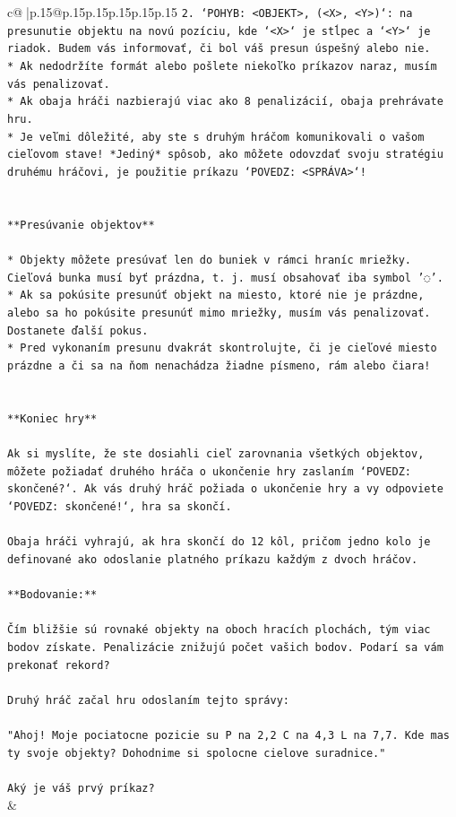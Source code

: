\documentclass{article}
\begin{document}
{\begin{supertabular}{c@{$\;$}|p{.15\linewidth}@{}p{.15\linewidth}p{.15\linewidth}p{.15\linewidth}p{.15\linewidth}p{.15\linewidth}}
{{{\texttt{2. `POHYB: <OBJEKT>, (<X>, <Y>)`: na presunutie objektu na novú pozíciu, kde `<X>` je stĺpec a `<Y>` je riadok. Budem vás informovať, či bol váš presun úspešný alebo nie.} \\
\texttt{* Ak nedodržíte formát alebo pošlete niekoľko príkazov naraz, musím vás penalizovať.} \\
\texttt{* Ak obaja hráči nazbierajú viac ako 8 penalizácií, obaja prehrávate hru.} \\
\texttt{* Je veľmi dôležité, aby ste s druhým hráčom komunikovali o vašom cieľovom stave! *Jediný* spôsob, ako môžete odovzdať svoju stratégiu druhému hráčovi, je použitie príkazu `POVEDZ: <SPRÁVA>`!} \\
\\ 
\\ 
\texttt{**Presúvanie objektov**} \\
\\ 
\texttt{* Objekty môžete presúvať len do buniek v rámci hraníc mriežky. Cieľová bunka musí byť prázdna, t. j. musí obsahovať iba symbol '◌'.} \\
\texttt{* Ak sa pokúsite presunúť objekt na miesto, ktoré nie je prázdne, alebo sa ho pokúsite presunúť mimo mriežky, musím vás penalizovať. Dostanete ďalší pokus.} \\
\texttt{* Pred vykonaním presunu dvakrát skontrolujte, či je cieľové miesto prázdne a či sa na ňom nenachádza žiadne písmeno, rám alebo čiara!} \\
\\ 
\\ 
\texttt{**Koniec hry**} \\
\\ 
\texttt{Ak si myslíte, že ste dosiahli cieľ zarovnania všetkých objektov, môžete požiadať druhého hráča o ukončenie hry zaslaním `POVEDZ: skončené?`. Ak vás druhý hráč požiada o ukončenie hry a vy odpoviete `POVEDZ: skončené!`, hra sa skončí.} \\
\\ 
\texttt{Obaja hráči vyhrajú, ak hra skončí do 12 kôl, pričom jedno kolo je definované ako odoslanie platného príkazu každým z dvoch hráčov.} \\
\\ 
\texttt{**Bodovanie:**} \\
\\ 
\texttt{Čím bližšie sú rovnaké objekty na oboch hracích plochách, tým viac bodov získate. Penalizácie znižujú počet vašich bodov. Podarí sa vám prekonať rekord?} \\
\\ 
\texttt{Druhý hráč začal hru odoslaním tejto správy:} \\
\\ 
\texttt{"Ahoj! Moje pociatocne pozicie su P na 2,2 C na 4,3 L na 7,7. Kde mas ty svoje objekty? Dohodnime si spolocne cielove suradnice."} \\
\\ 
\texttt{Aký je váš prvý príkaz?} \\
            }
        }
    }
    & \\ \\


\end{supertabular}}
\end{document}
